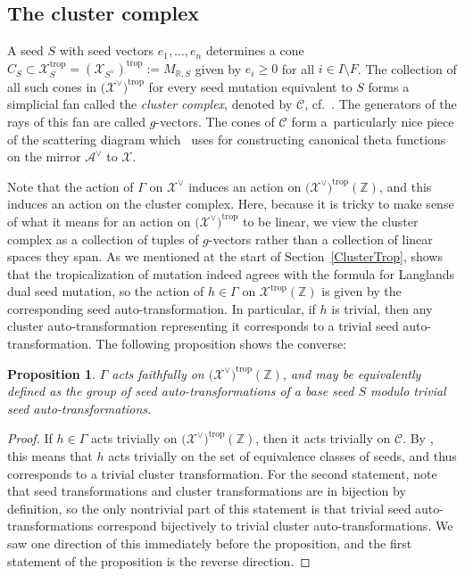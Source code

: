 \documentclass[pdftex]{sigma}
\numberwithin{equation}{section}
\numberwithin{figure}{section}
\numberwithin{table}{section}
\DeclareMathOperator{\trop}{trop}
\let\bb=\mathbb
\let\s=\mathcal
\newtheorem{prop}[thm]{Proposition}
\theoremstyle{definition}
\begin{document}
\subsection{The cluster complex}\label{ClusterComplex}
A seed $S$ with seed vectors $e_1,\dots,e_n$ determines a cone $C_S \subset \s{X}_S^{\trop}=(\s{X}_{S^{\vee}})^{\trop}:=M_{\bb{R},S}$ given by $e_i \geq 0$ for all $i\in I\setminus F$. The collection of all such cones in $\big(\s{X}^{\vee}\big)^{\trop}$ for every seed mutation equivalent to $S$ forms a simplicial fan called the {\it cluster complex}, denoted by $\s{C}$, cf.\ \cite[Theorem~0.8]{GHKK}. The generators of the rays of this fan are called $g$-vectors. The cones of $\s{C}$ form a~particularly nice piece of the scattering diagram which~\cite{GHKK} uses for constructing canonical theta functions on the mirror $\s{A}^{\vee}$ to $\s{X}$.

Note that the action of $\Gamma$ on $\s{X}^{\vee}$ induces an action on $\big(\s{X}^{\vee}\big)^{\trop}(\bb{Z})$, and this induces an action on the cluster complex. Here, because it is tricky to make sense of what it means for an action on $\big(\s{X}^{\vee}\big)^{\trop}$ to be linear, we view the cluster complex as a collection of tuples of $g$-vectors rather than a collection of linear spaces they span. As we mentioned at the start of Section~\ref{ClusterTrop}, \cite{GHK3} shows that the tropicalization of mutation indeed agrees with the formula for Langlands dual seed mutation, so the action of $h\in \Gamma$ on $\s{X}^{\trop}(\bb{Z})$ is given by the corresponding seed auto-transformation. In particular, if $h$ is trivial, then any cluster auto-transformation representing it corresponds to a trivial seed auto-transformation. The following proposition shows the converse:

\begin{prop}\label{TropClust}
$\Gamma$ acts faithfully on $\big(\s{X}^{\vee}\big)^{\trop}(\bb{Z})$, and may be equivalently defined as the group of seed auto-transformations of a base seed $S$ modulo trivial seed auto-transformations.
\end{prop}
\begin{proof}If $h \in \Gamma$ acts trivially on $\big(\s{X}^{\vee}\big)^{\trop}(\bb{Z})$, then it acts trivially on $\s{C}$. By \cite[Theorem~0.8]{GHKK}, this means that $h$ acts trivially on the set of equivalence classes of seeds, and thus corresponds to a trivial cluster transformation. For the second statement, note that seed transformations and cluster transformations are in bijection by definition, so the only nontrivial part of this statement is that trivial seed auto-transformations correspond bijectively to trivial cluster auto-transformations. We saw one direction of this immediately before the proposition, and the first statement of the proposition is the reverse direction.
\end{proof}
\end{document}
